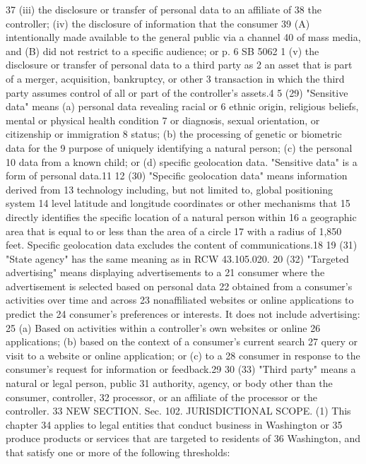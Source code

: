 37 (iii) the disclosure or transfer of personal data to an affiliate of
38 the controller; (iv) the disclosure of information that the consumer
39 (A) intentionally made available to the general public via a channel
40 of mass media, and (B) did not restrict to a specific audience; or
p. 6 SB 5062
1 (v) the disclosure or transfer of personal data to a third party as
2 an asset that is part of a merger, acquisition, bankruptcy, or other
3 transaction in which the third party assumes control of all or part
of the controller's assets.4
5 (29) "Sensitive data" means (a) personal data revealing racial or
6 ethnic origin, religious beliefs, mental or physical health condition
7 or diagnosis, sexual orientation, or citizenship or immigration
8 status; (b) the processing of genetic or biometric data for the
9 purpose of uniquely identifying a natural person; (c) the personal
10 data from a known child; or (d) specific geolocation data. "Sensitive
data" is a form of personal data.11
12 (30) "Specific geolocation data" means information derived from
13 technology including, but not limited to, global positioning system
14 level latitude and longitude coordinates or other mechanisms that
15 directly identifies the specific location of a natural person within
16 a geographic area that is equal to or less than the area of a circle
17 with a radius of 1,850 feet. Specific geolocation data excludes the
content of communications.18
19 (31) "State agency" has the same meaning as in RCW 43.105.020.
20 (32) "Targeted advertising" means displaying advertisements to a
21 consumer where the advertisement is selected based on personal data
22 obtained from a consumer's activities over time and across
23 nonaffiliated websites or online applications to predict the
24 consumer's preferences or interests. It does not include advertising:
25 (a) Based on activities within a controller's own websites or online
26 applications; (b) based on the context of a consumer's current search
27 query or visit to a website or online application; or (c) to a
28 consumer in response to the consumer's request for information or
feedback.29
30 (33) "Third party" means a natural or legal person, public
31 authority, agency, or body other than the consumer, controller,
32 processor, or an affiliate of the processor or the controller.
33 NEW SECTION. Sec. 102. JURISDICTIONAL SCOPE. (1) This chapter
34 applies to legal entities that conduct business in Washington or
35 produce products or services that are targeted to residents of
36 Washington, and that satisfy one or more of the following thresholds:

